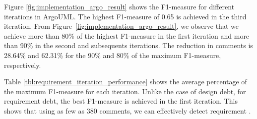 Figure \ref{fig:implementation_argo_result} shows the F1-measure for different iterations in ArgoUML. The highest F1-measure of 0.65 is achieved in the third iteration. From Figure~\ref{fig:implementation_argo_result}, we observe that we achieve more than 80\% of the highest F1-measure in the first iteration and more than 90\% in the second and subsequents iterations. The reduction in comments is 28.64\% and 62.31\% for the 90\% and 80\% of the maximum F1-measure, respectively.



Table \ref{tbl:requirement_iteration_performance} shows the average percentage of the maximum F1-measure for each iteration. Unlike the case of design debt, for requirement debt, the best F1-measure is achieved in the first iteration. This shows that using as few as 380 comments, we can effectively detect requirement \SATD.



